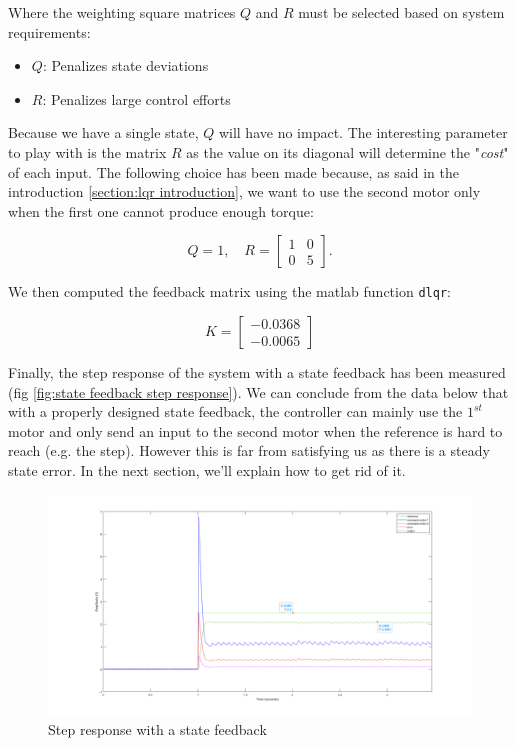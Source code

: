 Where the weighting square matrices \( Q \) and \( R \) must be selected based on system requirements:

\begin{itemize}
    \item \( Q \): Penalizes state deviations
    \item \( R \): Penalizes large control efforts
\end{itemize}

Because we have a single state, $Q$ will have no impact. The interesting parameter to play with is the matrix $R$ as the
value on its diagonal will determine the "\textit{cost}" of each input. The following choice has been made because, as 
said in the introduction \ref{section:lqr introduction}, we want to use the second motor only when the first one cannot 
produce enough torque:

\[
Q = 1, \quad
R = \begin{bmatrix}
1 & 0 \\
0 & 5
\end{bmatrix}.
\]

We then computed the feedback matrix using the matlab function \texttt{dlqr}:

\[
K = \begin{bmatrix}
    -0.0368\\
    -0.0065
\end{bmatrix}
\]

Finally, the step response of the system with a state feedback has been measured (fig \ref{fig:state feedback step 
response}). We can conclude from the data below that with a properly designed state feedback, the controller can mainly
use the $1^{st}$ motor and only send an input to the second motor when the reference is hard to reach (e.g. the step).
However this is far from satisfying us as there is  a steady state error. In the next section, we'll explain how to get 
rid of it.

\begin{figure}[H]
    \centering
    \includegraphics[width = \textwidth]{Pictures/without_PI.png}
    \caption{Step response with a state feedback}
    \label{fig:state feedback step response}
\end{figure}

